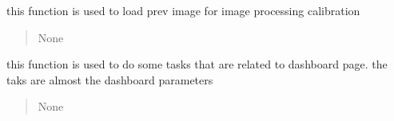 \documentclass[letterpaper,10pt,english]{sphinxmanual}
\begin{document}
\begin{savenotes}
\begin{fulllineitems}
\begin{savenotes}\begin{fulllineitems}
\label{\detokenize{setting/setting_api:oxin.setting_api.API.previous_image_precessing}}
\pysigstartsignatures
{}
\pysigstopsignatures
\sphinxAtStartPar
this function is used to load prev image for image processing calibration
\begin{quote}\begin{description}
\sphinxAtStartPar
None

\end{description}\end{quote}

\end{fulllineitems}\end{savenotes}


\begin{savenotes}\begin{fulllineitems}
\label{\detokenize{setting/setting_api:oxin.setting_api.API.refresh_dashboard_page}}
\pysigstartsignatures
{}
\pysigstopsignatures
\sphinxAtStartPar
this function is used to do some tasks that are related to dashboard page.
the taks are almost the dashboard parameters
\begin{quote}\begin{description}
\sphinxAtStartPar
None

\end{description}\end{quote}

\end{fulllineitems}\end{savenotes}



\end{fulllineitems}
\end{savenotes}
\end{document}
